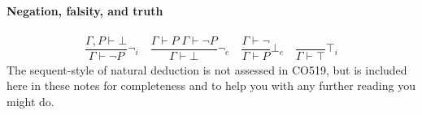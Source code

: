 \documentclass{article}
\theoremstyle{definition}
\begin{document}
\paragraph{Negation,  falsity, and truth}

\begin{align*}
  \dfrac{\Gamma, P \vdash \bot}{\Gamma \vdash \neg P} {\neg_i}
  \quad
  \dfrac{\Gamma \vdash P \; \Gamma \vdash \neg P}{\Gamma \vdash \bot} {\neg_e}
  \quad
  \dfrac{\Gamma \vdash \neg}{\Gamma \vdash P} {\bot_e}
  \quad
  \dfrac{}{\Gamma \vdash \top} {\top_i}
\end{align*}
%
The sequent-style of natural deduction is not assessed in CO519, but
is included here in these notes for completeness and to help you with
any further reading you might do.
  
\end{document}

